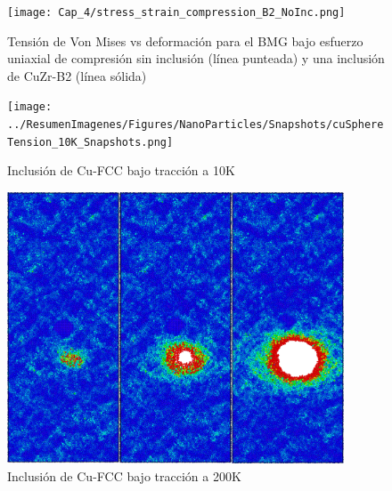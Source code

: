 \begin{figure}[htp]
\centering
\texttt{[image: Cap\_4/stress\_strain\_compression\_B2\_NoInc.png]}
\caption[Von Mises vs deformación en compresión. Inclusión de CuZr-B2]{Tensión de Von Mises vs deformación para el BMG bajo esfuerzo uniaxial de compresión sin inclusión (línea punteada) y una inclusión de CuZr-B2 (línea sólida)}
\label{C4:fg:b2_vm_compression}
\end{figure}

\begin{figure}[htp]
\centering
\texttt{[image: ../ResumenImagenes/Figures/NanoParticles/Snapshots/cuSphereTension\_10K\_Snapshots.png]}
\caption[Inclusión de Cu-FCC bajo tracción a 10K]{Inclusión de Cu-FCC bajo tracción a 10K}
\label{C4:fg:snapshot_ten_FCC_10K}
\end{figure}

% 

\begin{figure}[htp]
\centering
\includegraphics[width=10cm]{../ResumenImagenes/Figures/NanoParticles/Snapshots/cuSphereTension_200K_Snapshots.png}
\caption[Inclusión de Cu-FCC bajo tracción a 200K]{Inclusión de Cu-FCC bajo tracción a 200K}
\label{C4:fg:snapshot_ten_FCC_200K}
\end{figure}

